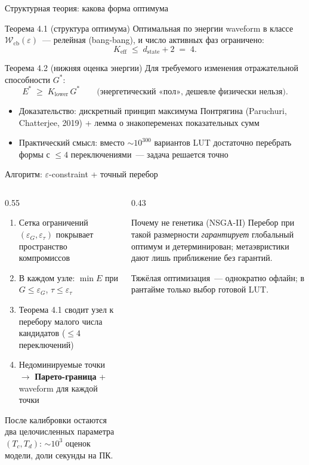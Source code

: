 \documentclass[aspectratio=169,11pt]{beamer}
\begin{document}
\begin{frame}{Структурная теория: какова форма оптимума}
  \begin{block}{Теорема 4.1 (структура оптимума)}
    Оптимальная по энергии waveform в классе $\mathcal W_{\mathrm{cb}}(\varepsilon)$~--- релейная (bang-bang), и число активных фаз ограничено:
    $$K_{\mathrm{eff}} \;\le\; d_{\mathrm{state}} + 2 \;=\; 4.$$
  \end{block}
  \begin{block}{Теорема 4.2 (нижняя оценка энергии)}
    Для требуемого изменения отражательной способности $G^{*}$:
    $$E^{*} \;\ge\; K_{\mathrm{lower}}\, G^{*} \qquad \text{(энергетический «пол», дешевле физически нельзя)}.$$
  \end{block}
  \vspace{1mm}
  \begin{itemize}
    \item Доказательство: дискретный принцип максимума Понтрягина (Paruchuri, Chatterjee, 2019) + лемма о знакопеременах показательных сумм
    \item \alert{Практический смысл:} вместо $\sim 10^{300}$ вариантов LUT достаточно перебрать формы с $\le4$ переключениями~--- задача решается точно
  \end{itemize}
\end{frame}

\begin{frame}{Алгоритм: $\varepsilon$-constraint + точный перебор}
  \begin{columns}[T]
    \begin{column}{0.55\textwidth}
      \begin{enumerate}
        \item Сетка ограничений $(\varepsilon_G, \varepsilon_\tau)$ покрывает пространство компромиссов
        \item В каждом узле: $\min E$ при $G\le\varepsilon_G$, $\tau\le\varepsilon_\tau$
        \item Теорема 4.1 сводит узел к перебору малого числа кандидатов ($\le4$ переключений)
        \item Недоминируемые точки $\to$ \textbf{Парето-граница} + waveform для каждой точки
      \end{enumerate}
      \vspace{2mm}
      После калибровки остаются два целочисленных параметра $(T_c, T_d)$: $\sim10^3$ оценок модели, доли секунды на ПК.
    \end{column}
    \begin{column}{0.43\textwidth}
      \begin{block}{Почему не генетика (NSGA-II)}
        Перебор при такой размерности \emph{гарантирует} глобальный оптимум и детерминирован; метаэвристики дают лишь приближение без гарантий.
      \end{block}
      \vspace{2mm}
      \small Тяжёлая оптимизация~--- однократно офлайн; в рантайме только выбор готовой LUT.
    \end{column}
  \end{columns}
\end{frame}
\end{document}
